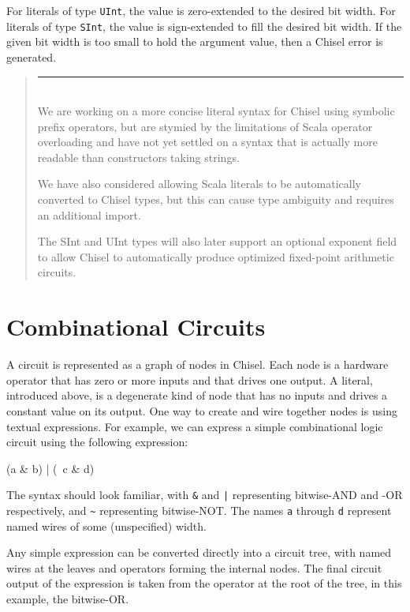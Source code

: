 \documentclass[twocolumn,10pt]{article}
\newenvironment{commentary}
{ \vspace{-0.1in}
  \begin{quotation}
  \noindent
  \small \em
  \rule{\linewidth}{1pt}\\
}
{
  \end{quotation}
}
\def\code#1{{\tt #1}}
\begin{document}
\noindent
For literals of type \code{UInt}, the value is
zero-extended to the desired bit width.  For literals of type
\code{SInt}, the value is sign-extended to fill the desired bit width.
If the given bit width is too small to hold the argument value, then a
Chisel error is generated.

\begin{commentary}
We are working on a more concise literal syntax for Chisel using
symbolic prefix operators, but are stymied by the limitations of Scala
operator overloading and have not yet settled on a syntax that is
actually more readable than constructors taking strings.

We have also considered allowing Scala literals to be automatically
converted to Chisel types, but this can cause type ambiguity and
requires an additional import.

The SInt and UInt types will also later support an optional exponent
field to allow Chisel to automatically produce optimized fixed-point
arithmetic circuits.
\end{commentary}

\section{Combinational Circuits}

A circuit is represented as a graph of nodes in Chisel.  Each node is
a hardware operator that has zero or more inputs and that drives one
output.  A literal, introduced above, is a degenerate kind of node
that has no inputs and drives a constant value on its output.  One way
to create and wire together nodes is using textual expressions.  For
example, we can express a simple combinational logic circuit
using the following expression:

\begin{scala}
(a & b) | (~c & d)
\end{scala}

The syntax should look familiar, with \code{\&} and \code{|}
representing bitwise-AND and -OR respectively, and \code{\~{}}
representing bitwise-NOT.  The names \code{a} through \code{d}
represent named wires of some (unspecified) width.

Any simple expression can be converted directly into a circuit tree,
with named wires at the leaves and operators forming the internal
nodes.  The final circuit output of the expression is taken from the
operator at the root of the tree, in this example, the bitwise-OR.
\end{document}
